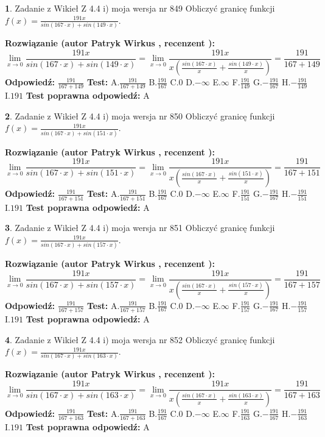 \documentclass[12pt, a4paper]{article}
\theoremstyle{definition} %
\newtheorem{zad}{}
\newcommand{\zadStart}[1]{\begin{zad}#1\newline}
\newcommand{\zadStop}{\end{zad}}
\newcommand{\rozwStart}[2]{\noindent \textbf{Rozwiązanie (autor #1 , recenzent #2): }\newline}
\newcommand{\rozwStop}{\newline}
\newcommand{\odpStart}{\noindent \textbf{Odpowiedź:}\newline}
\newcommand{\odpStop}{\newline}
\newcommand{\testStart}{\noindent \textbf{Test:}\newline}
\newcommand{\testStop}{\newline}
\newcommand{\kluczStart}{\noindent \textbf{Test poprawna odpowiedź:}\newline}
\newcommand{\kluczStop}{\newline}
\begin{document}
\zadStart{Zadanie z Wikieł Z 4.4 i) moja wersja nr 849}
Obliczyć granicę funkcji $f(x)=\frac{191x}{sin(167\cdot x) +sin(149\cdot x)}$.
\zadStop
\rozwStart{Patryk Wirkus}{}
$$\lim\limits_{x\to 0}\frac{191x}{sin(167\cdot x) +sin(149\cdot x)}=\lim\limits_{x\to 0}\frac{191x}{x(\frac{sin(167\cdot x)}{x}+\frac{sin(149\cdot x)}{x})}=\frac{191}{167+149}$$
\rozwStop
\odpStart
$\frac{191}{167+149}$
\odpStop
\testStart
A.$\frac{191}{167+149}$
B.$\frac{191}{167}$
C.$0$
D.$-\infty$
E.$\infty$
F.$\frac{191}{149}$
G.$-\frac{191}{167}$
H.$-\frac{191}{149}$
I.$191$
\testStop
\kluczStart
A
\kluczStop



\zadStart{Zadanie z Wikieł Z 4.4 i) moja wersja nr 850}
Obliczyć granicę funkcji $f(x)=\frac{191x}{sin(167\cdot x) +sin(151\cdot x)}$.
\zadStop
\rozwStart{Patryk Wirkus}{}
$$\lim\limits_{x\to 0}\frac{191x}{sin(167\cdot x) +sin(151\cdot x)}=\lim\limits_{x\to 0}\frac{191x}{x(\frac{sin(167\cdot x)}{x}+\frac{sin(151\cdot x)}{x})}=\frac{191}{167+151}$$
\rozwStop
\odpStart
$\frac{191}{167+151}$
\odpStop
\testStart
A.$\frac{191}{167+151}$
B.$\frac{191}{167}$
C.$0$
D.$-\infty$
E.$\infty$
F.$\frac{191}{151}$
G.$-\frac{191}{167}$
H.$-\frac{191}{151}$
I.$191$
\testStop
\kluczStart
A
\kluczStop



\zadStart{Zadanie z Wikieł Z 4.4 i) moja wersja nr 851}
Obliczyć granicę funkcji $f(x)=\frac{191x}{sin(167\cdot x) +sin(157\cdot x)}$.
\zadStop
\rozwStart{Patryk Wirkus}{}
$$\lim\limits_{x\to 0}\frac{191x}{sin(167\cdot x) +sin(157\cdot x)}=\lim\limits_{x\to 0}\frac{191x}{x(\frac{sin(167\cdot x)}{x}+\frac{sin(157\cdot x)}{x})}=\frac{191}{167+157}$$
\rozwStop
\odpStart
$\frac{191}{167+157}$
\odpStop
\testStart
A.$\frac{191}{167+157}$
B.$\frac{191}{167}$
C.$0$
D.$-\infty$
E.$\infty$
F.$\frac{191}{157}$
G.$-\frac{191}{167}$
H.$-\frac{191}{157}$
I.$191$
\testStop
\kluczStart
A
\kluczStop



\zadStart{Zadanie z Wikieł Z 4.4 i) moja wersja nr 852}
Obliczyć granicę funkcji $f(x)=\frac{191x}{sin(167\cdot x) +sin(163\cdot x)}$.
\zadStop
\rozwStart{Patryk Wirkus}{}
$$\lim\limits_{x\to 0}\frac{191x}{sin(167\cdot x) +sin(163\cdot x)}=\lim\limits_{x\to 0}\frac{191x}{x(\frac{sin(167\cdot x)}{x}+\frac{sin(163\cdot x)}{x})}=\frac{191}{167+163}$$
\rozwStop
\odpStart
$\frac{191}{167+163}$
\odpStop
\testStart
A.$\frac{191}{167+163}$
B.$\frac{191}{167}$
C.$0$
D.$-\infty$
E.$\infty$
F.$\frac{191}{163}$
G.$-\frac{191}{167}$
H.$-\frac{191}{163}$
I.$191$
\testStop
\kluczStart
A
\kluczStop
\end{document}
